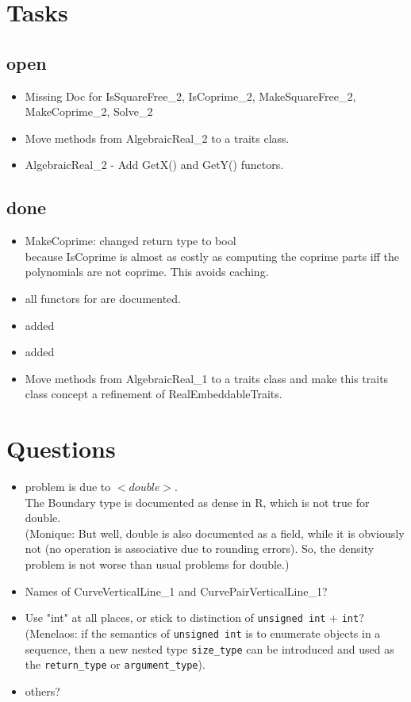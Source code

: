 
\section{Tasks}

\subsection{open}
\begin{itemize}
\item Missing Doc for IsSquareFree\_2, IsCoprime\_2, MakeSquareFree\_2,
   MakeCoprime\_2, Solve\_2
\item Move methods from AlgebraicReal\_2 to a traits class.
\item AlgebraicReal\_2 - Add GetX() and GetY() functors.
\end{itemize}

\subsection{done} 
\begin{itemize}
\item MakeCoprime: changed return type to bool\\
      because IsCoprime is almost as costly as computing the coprime
      parts iff the polynomials are not coprime. This avoids caching.  
\item all functors for  
      are documented.
\item added 
\item added  
\item Move methods from AlgebraicReal\_1 to a traits class and make
  this traits class concept a refinement of RealEmbeddableTraits.
\end{itemize}


\section{Questions}
\begin{itemize}
\item problem is due to $<double>$.\\
    The Boundary type is documented as dense in R, which is not true
    for double.\\ (Monique: But well, double is also documented as a
    field, while it is obviously not (no operation is associative
    due to rounding errors). So, the density problem is not worse
    than usual problems for double.)
 \item Names of CurveVerticalLine\_1 and CurvePairVerticalLine\_1?
 \item Use "int" at all places, or stick to distinction of \texttt{unsigned
   int} + \texttt{int}?
   (Menelaos: if the semantics of \texttt{unsigned int} is to enumerate
   objects in a sequence, then a new nested type \texttt{size\_type}
   can be introduced and used as the \texttt{return\_type} or
   \texttt{argument\_type}).
 \item others?
\end{itemize}


